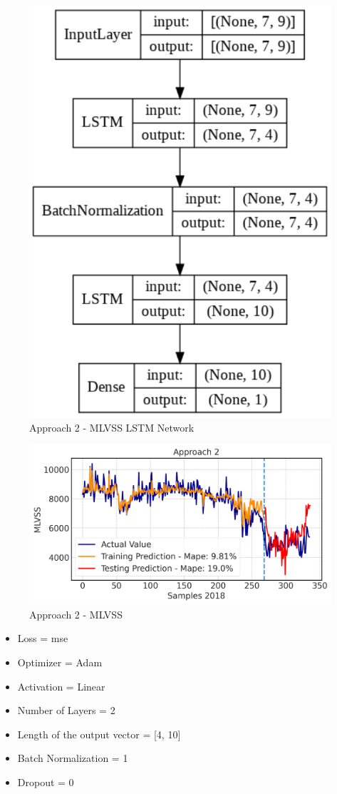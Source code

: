 \begin{figure}[h]
\centering
\includegraphics[width=0.4\linewidth]{figures/Ch5/App2_MLVSS.pdf}
\caption{Approach 2 - MLVSS LSTM Network}
\label{f:App2-MLVSS-nn}
\end{figure}

\begin{figure}[h]
\centering
\includegraphics[width=\linewidth]{figures/Ch5/MLVSS-approach2.pdf}
\caption{Approach 2 - MLVSS}
\label{f:App2-MLVSS}
\end{figure}

\begin{itemize}
    \item Loss = mse
    \item Optimizer = Adam
    \item Activation =  Linear
    \item Number of Layers = 2
    \item Length of the output vector = [4, 10]
    \item Batch Normalization = 1
    \item Dropout = 0
\end{itemize}

